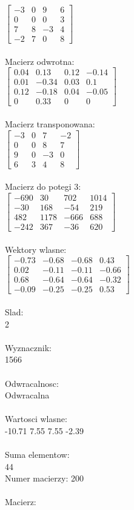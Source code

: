 \documentclass[a4paper,12pt]{article}
\begin{document}
$\begin{bmatrix} -3&0&9&6\\0&0&0&3\\7&8&-3&4\\-2&7&0&8 \end{bmatrix}$
\\
\\
Macierz odwrotna:\\

$\begin{bmatrix} 0.04&0.13&0.12&-0.14\\0.01&-0.34&0.03&0.1\\0.12&-0.18&0.04&-0.05\\0&0.33&0&0 \end{bmatrix}$
\\
\\
Macierz transponowana:\\

$\begin{bmatrix} -3&0&7&-2\\0&0&8&7\\9&0&-3&0\\6&3&4&8 \end{bmatrix}$
\\
\\
Macierz do potegi 3:\\

$\begin{bmatrix} -690&30&702&1014\\-30&168&-54&219\\482&1178&-666&688\\-242&367&-36&620 \end{bmatrix}$
\\
\\
Wektory wlasne:\\

$\begin{bmatrix} -0.73&-0.68&-0.68&0.43\\0.02&-0.11&-0.11&-0.66\\0.68&-0.64&-0.64&-0.32\\-0.09&-0.25&-0.25&0.53 \end{bmatrix}$
\\
\\
Slad:\\
2
\\
\\
Wyznacznik:\\
1566
\\
\\
Odwracalnosc:\\
Odwracalna
\\
\\
Wartosci wlasne:\\
-10.71 7.55 7.55 -2.39
\\
\\
Suma elementow:\\
44
\\
\newpage
Numer macierzy:
200
\\
\\
Macierz:\\
\end{document}
